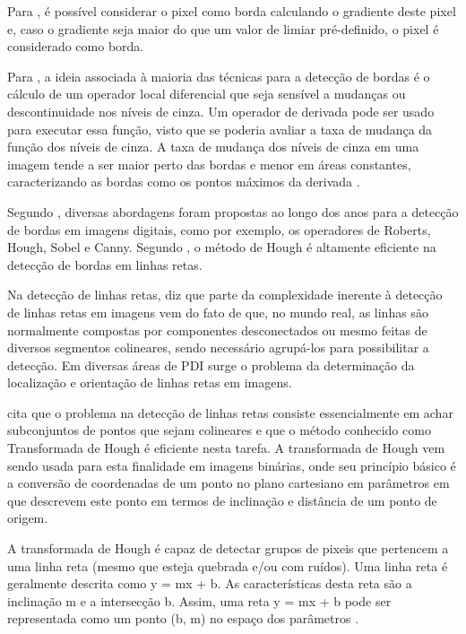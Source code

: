 Para , é possível considerar o pixel como borda calculando o gradiente deste pixel e, caso o gradiente seja maior do que um valor de limiar pré-definido, o pixel é considerado como borda. 

Para , a ideia associada à maioria das técnicas para a detecção de bordas é o cálculo de um operador local diferencial que seja sensível a mudanças ou descontinuidade nos níveis de cinza. Um operador de derivada pode ser usado para executar essa função, visto que se poderia avaliar a taxa de mudança da função dos níveis de cinza. A taxa de mudança dos níveis de cinza em uma imagem tende a ser maior perto das bordas e menor em áreas constantes, caracterizando as bordas como os pontos máximos da derivada \cite{PEDRINI2008}.

Segundo , diversas abordagens foram propostas ao longo dos anos para a detecção de bordas em imagens digitais, como por exemplo, os operadores de Roberts, Hough, Sobel e Canny. Segundo , o método de Hough é altamente eficiente na detecção de bordas em linhas retas.


Na detecção de linhas retas,  diz que parte da complexidade inerente à detecção de linhas retas em imagens vem do fato de que, no mundo real, as linhas são normalmente compostas por componentes desconectados ou mesmo feitas de diversos segmentos colineares, sendo necessário agrupá-los para possibilitar a detecção. Em diversas áreas de PDI surge o problema da determinação da localização e orientação de linhas retas em imagens.


 cita que o problema na detecção de linhas retas consiste essencialmente em achar subconjuntos de pontos que sejam colineares e que o método conhecido como Transformada de Hough é eficiente nesta tarefa. A transformada de Hough vem sendo usada para esta finalidade em imagens binárias, onde seu princípio básico é a conversão de coordenadas de um ponto no plano cartesiano em parâmetros em que descrevem este ponto em termos de inclinação e distância de um ponto de origem.


A transformada de Hough é capaz de detectar grupos de pixeis que pertencem a uma linha reta (mesmo que esteja quebrada e/ou com ruídos). Uma linha reta é geralmente descrita como y = mx + b. As características desta reta são a inclinação m e a intersecção b. Assim, uma reta y = mx + b pode ser representada como um ponto (b, m) no espaço dos parâmetros \cite{HOUGHKIM}. 

